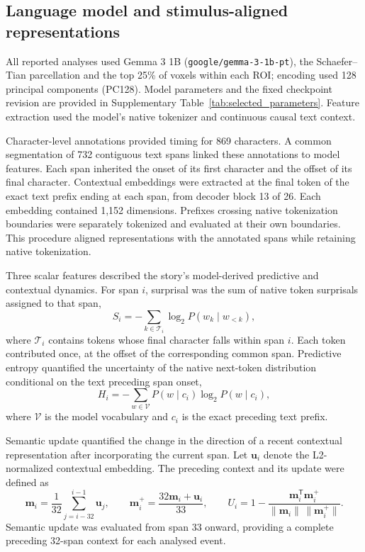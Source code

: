 \subsection{Language model and stimulus-aligned representations}
All reported analyses used Gemma 3 1B (\texttt{google/gemma-3-1b-pt}), the Schaefer--Tian parcellation and the top 25\% of voxels within each ROI; encoding used 128 principal components (PC128). Model parameters and the fixed checkpoint revision are provided in Supplementary Table~\ref{tab:selected_parameters}. Feature extraction used the model's native tokenizer and continuous causal text context.

Character-level annotations provided timing for 869 characters. A common segmentation of 732 contiguous text spans linked these annotations to model features. Each span inherited the onset of its first character and the offset of its final character. Contextual embeddings were extracted at the final token of the exact text prefix ending at each span, from decoder block 13 of 26. Each embedding contained 1,152 dimensions. Prefixes crossing native tokenization boundaries were separately tokenized and evaluated at their own boundaries. This procedure aligned representations with the annotated spans while retaining native tokenization.

Three scalar features described the story's model-derived predictive and contextual dynamics. For span $i$, surprisal was the sum of native token surprisals assigned to that span,
\begin{equation}
 S_i=-\sum_{k\in\mathcal{T}_i}\log_2 P(w_k\mid w_{<k}),
\end{equation}
where $\mathcal{T}_i$ contains tokens whose final character falls within span $i$. Each token contributed once, at the offset of the corresponding common span. Predictive entropy quantified the uncertainty of the native next-token distribution conditional on the text preceding span onset,
\begin{equation}
 H_i=-\sum_{w\in\mathcal{V}}P(w\mid c_i)\log_2 P(w\mid c_i),
\end{equation}
where $\mathcal{V}$ is the model vocabulary and $c_i$ is the exact preceding text prefix.

Semantic update quantified the change in the direction of a recent contextual representation after incorporating the current span. Let $\mathbf{u}_i$ denote the L2-normalized contextual embedding. The preceding context and its update were defined as
\begin{equation}
 \mathbf{m}_i=\frac{1}{32}\sum_{j=i-32}^{i-1}\mathbf{u}_j,
 \qquad
 \mathbf{m}_i^{+}=\frac{32\mathbf{m}_i+\mathbf{u}_i}{33},
 \qquad
 U_i=1-\frac{\mathbf{m}_i^{\mathsf T}\mathbf{m}_i^{+}}
 {\|\mathbf{m}_i\|\,\|\mathbf{m}_i^{+}\|}.
\end{equation}
Semantic update was evaluated from span 33 onward, providing a complete preceding 32-span context for each analysed event.

